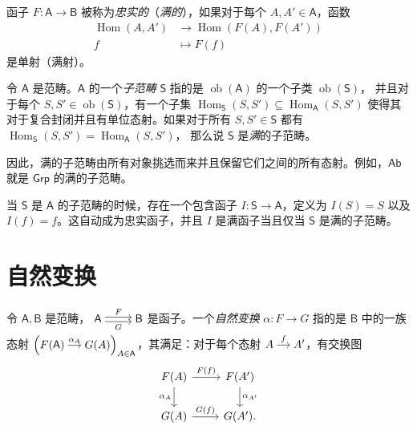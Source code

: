 \documentclass[fontset=none]{Notes}
\newenvironment{arr}[1][]{%
  $\begin{tikzcd}[cramped,#1]
}{\end{tikzcd}$}
\DeclareMathOperator\Hom{Hom}
\DeclareMathOperator\ob{ob}
\newcommand{\cat}[1]{\mathsf{#1}}
\begin{document}
\begin{definition}
  函子 $F:\cat A\to\cat B$ 被称为\emph{忠实的}（\emph{满的}），如果对于每个 $A,A'\in\cat A$，函数
  \begin{align*}
    \Hom(A,A')&\to \Hom(F(A),F(A'))\\
    f&\mapsto F(f)
  \end{align*}
  是单射（满射）。
\end{definition}

\begin{definition}
  令 $\cat A$ 是范畴。$\cat A$ 的一个\emph{子范畴} $\cat S$ 指的是 $\ob(\cat A)$ 的一个子类 $\ob(\cat S)$，
  并且对于每个 $S,S'\in\ob(\cat S)$，有一个子集 $\Hom_{\cat S}(S,S')\subseteq \Hom_{\cat A}(S,S')$
  使得其对于复合封闭并且有单位态射。如果对于所有 $S,S'\in\cat S$ 都有 $\Hom_{\cat S}(S,S')=\Hom_{\cat A}(S,S')$，
  那么说 $\cat S$ 是\emph{满}的子范畴。
\end{definition}

因此，满的子范畴由所有对象挑选而来并且保留它们之间的所有态射。例如，$\cat{Ab}$ 就是 $\cat{Grp}$ 的满的子范畴。

当 $\cat S$ 是 $\cat A$ 的子范畴的时候，存在一个包含函子 $I:\cat S\to\cat A$，定义为 $I(S)=S$
以及 $I(f)=f$。这自动成为忠实函子，并且 $I$ 是满函子当且仅当 $\cat S$ 是满的子范畴。

\section{自然变换}

\begin{definition}
  令 $\cat A,\cat B$ 是范畴，
  \begin{arr}
    \cat A\arrow[r,yshift=2pt,"F"]\arrow[r,yshift=-2pt,"G"'] & \cat B
  \end{arr}
  是函子。一个\emph{自然变换} $\alpha:F\to G$ 指的是 $\cat B$ 中的一族态射
  $\left(
    \begin{tikzcd}[sep=small,cramped]
      F(\cat A)\arrow[r,"\alpha_A"] & G(A)
    \end{tikzcd}
  \right)_{A\in\cat A}$，其满足：对于每个态射 
  \begin{arr}[sep=small]
    A\arrow[r,"f"] & A'
  \end{arr}，有交换图
  \[
    \begin{tikzcd}
      F(A)\arrow[r,"F(f)"]\arrow[d,"\alpha_A"'] & F(A')\arrow[d,"\alpha_{A'}"] \\
      G(A)\arrow[r,"G(f)"] & G(A').
    \end{tikzcd}
  \]
\end{definition}
\end{document}
